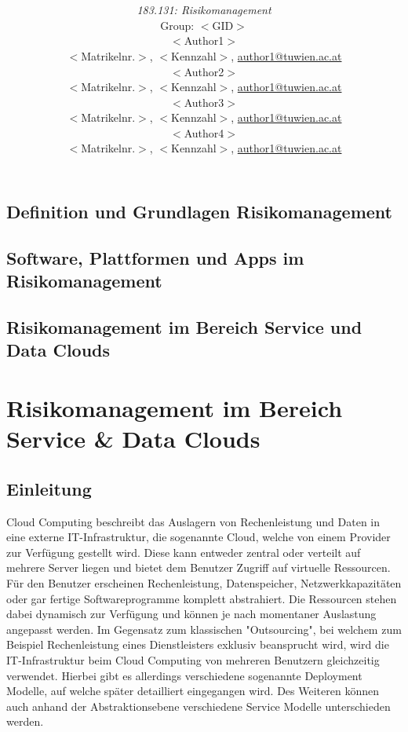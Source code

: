 \documentclass[a4paper,11pt]{article}
\title{\textbf{\sffamily\Huge \ShortTitle}\\ 
{}
\vspace{1cm}}
\author{
{\em 183.131: Risikomanagement} \vspace{1cm} \\
Group: $<$GID$>$\bigskip \\
$<$Author1$>$ \\ {\small $<$Matrikelnr.$>$, $<$Kennzahl$>$, \href{mailto:author1@tuwien.ac.at}{author1@tuwien.ac.at}}\\
$<$Author2$>$ \\ {\small $<$Matrikelnr.$>$, $<$Kennzahl$>$, \href{mailto:author2@tuwien.ac.at}{author1@tuwien.ac.at}}\\
$<$Author3$>$ \\ {\small $<$Matrikelnr.$>$, $<$Kennzahl$>$, \href{mailto:author3@tuwien.ac.at}{author1@tuwien.ac.at}}\\
$<$Author4$>$ \\ {\small $<$Matrikelnr.$>$, $<$Kennzahl$>$, \href{mailto:author4@tuwien.ac.at}{author1@tuwien.ac.at}}\\ 
\vspace{4cm}
}
\begin{document}
\begin{titlepage}
\maketitle

\end{titlepage}


\thispagestyle{empty}
\tableofcontents
\pagebreak

\setcounter{page}{1}


\section{Definition und Grundlagen Risikomanagement}
\label{sect:grundlagen}


\section{Software, Plattformen und Apps im Risikomanagement}
\label{sect:software}



\section{Risikomanagement im Bereich Service und Data Clouds}
\label{sect:clouds}
\chapter{Risikomanagement im Bereich Service \& Data Clouds}

\section{Einleitung}
Cloud Computing beschreibt das Auslagern von Rechenleistung und Daten in eine externe IT-Infrastruktur, die sogenannte Cloud, welche von einem Provider zur Verfügung gestellt wird. Diese kann entweder zentral oder verteilt auf mehrere Server liegen und bietet dem Benutzer Zugriff auf virtuelle Ressourcen. Für den Benutzer erscheinen Rechenleistung, Datenspeicher, Netzwerkkapazitäten oder gar fertige Softwareprogramme komplett abstrahiert. Die Ressourcen stehen dabei dynamisch zur Verfügung und können je nach momentaner Auslastung angepasst werden. Im Gegensatz zum klassischen "Outsourcing", bei welchem zum Beispiel Rechenleistung eines Dienstleisters exklusiv beansprucht wird, wird die IT-Infrastruktur beim Cloud Computing von mehreren Benutzern gleichzeitig verwendet. Hierbei gibt es allerdings verschiedene sogenannte Deployment Modelle, auf welche später detailliert eingegangen wird. Des Weiteren können auch anhand der Abstraktionsebene verschiedene Service Modelle unterschieden werden. 
\end{document}
